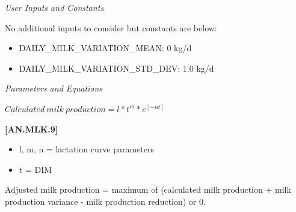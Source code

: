 \begin{refsection}
\begin{enumerate}
         \textit{User Inputs and Constants}
         \vspace{0.1cm}

         No additional inputs to consider but constants are below: 
        \begin{itemize}
            \item DAILY\_MILK\_VARIATION\_MEAN: 0 kg/d
            \item DAILY\_MILK\_VARIATION\_STD\_DEV: 1.0 kg/d 
        \end{itemize}

         \textit{Parameters and Equations}
         \vspace{0.1cm}

    \begin{center}
\(Calculated\ milk\ production = l*t^m *e^{[-nt]}\)
    \end{center}
        \vspace{0.5cm} 
    
            {\raggedleft \textbf{[AN.MLK.9]}\par}
            \vspace{0.2cm}

        \begin{itemize}
            \item l, m, n = lactation curve parameters
            \item t = DIM
        \end{itemize}
        \vspace{0.2cm}

        \begin{tcolorbox}[colback=white, colframe=black, boxrule=0.5pt, arc=3pt, width=\textwidth]
            Adjusted milk production = maximum of (calculated milk production + milk production variance - milk production reduction) or 0.
        \end{tcolorbox}
        \vspace{0.2cm}


\end{enumerate}
\end{refsection}
